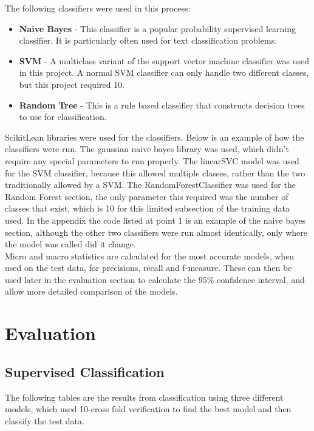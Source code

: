 \documentclass[11pt]{article}
\begin{document}
The following classifiers were used in this process:
\begin{itemize}
\item \textbf{Naive Bayes} - This classifier is a popular probability supervised learning classifier. It is particularly often used for text classification problems.
\item \textbf{SVM} - A multiclass variant of the support vector machine classifier was used in this project. A normal SVM classifier can only handle two different classes, but this project required 10.
\item \textbf{Random Tree} - This is a rule based classifier that constructs decision trees to use for classification.
\end{itemize}

ScikitLean libraries were used for the classifiers. Below is an example of how the classifiers were run. The gaussian naive bayes library was used, which didn't require any special parameters to run properly. The linearSVC model was used for the SVM classifier, because this allowed multiple classes, rather than the two traditionally allowed by a SVM. The RandomForestClassifier was used for the Random Forest section, the only parameter this required was the number of classes that exist, which is 10 for this limited subsection of the training data used. In the appendix the code listed at point 1 is an example of the naive bayes section, although the other two classifiers were run almost identically, only where the model was called did it change. \\

Micro and macro statistics are calculated for the most accurate models, when used on the test data, for precisions, recall and f-measure. These can then be used later in the evaluation section to calculate the 95\% confidence interval, and allow more detailed comparison of the models. \\

\section{Evaluation}
\subsection{Supervised Classification}
The following tables are the results from classification using three different models, which used 10-cross fold verification to find the best model and then classify the test data.
\end{document}
